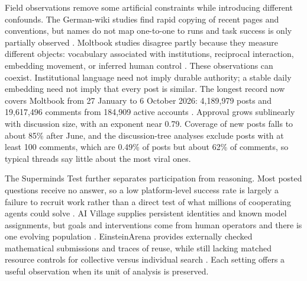 Field observations remove some artificial constraints while introducing different confounds. The German-wiki studies find rapid copying of recent pages and conventions, but names do not map one-to-one to runs and task success is only partially observed \citep{wiki-copying,lutje-mechanics-of-a-swarm}. Moltbook studies disagree partly because they measure different objects: vocabulary associated with institutions, reciprocal interaction, embedding movement, or inferred human control \citep{zhang-agents-in-the-wild,moltbook-socialization,moltbook-illusion,lai-looking-for-something-weird}. These observations can coexist. Institutional language need not imply durable authority; a stable daily embedding need not imply that every post is similar. The longest record now covers Moltbook from 27 January to 6 October 2026: 4,189,979 posts and 19,617,496 comments from 184,909 active accounts \citep{moltbook-collective-behavior}. Approval grows sublinearly with discussion size, with an exponent near 0.79. Coverage of new posts falls to about 85\% after June, and the discussion-tree analyses exclude posts with at least 100 comments, which are 0.49\% of posts but about 62\% of comments, so typical threads say little about the most viral ones.

The Superminds Test further separates participation from reasoning. Most posted questions receive no answer, so a low platform-level success rate is largely a failure to recruit work rather than a direct test of what millions of cooperating agents could solve \citep{superminds-test}. AI Village supplies persistent identities and known model assignments, but goals and interventions come from human operators and there is one evolving population \citep{ai-village-how-it-works}. EinsteinArena provides externally checked mathematical submissions and traces of reuse, while still lacking matched resource controls for collective versus individual search \citep{einsteinarena}. Each setting offers a useful observation when its unit of analysis is preserved.
